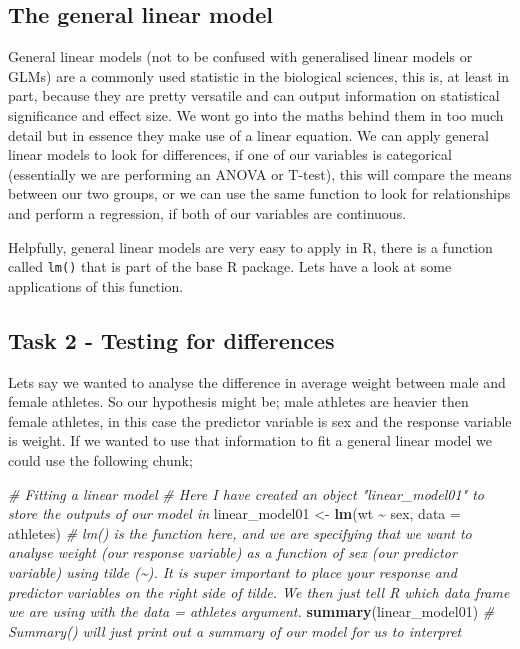 \documentclass[
]{book}
\newenvironment{Shaded}{\begin{snugshade}}{\end{snugshade}}
\newcommand{\AttributeTok}[1]{\textcolor[rgb]{0.13,0.29,0.53}{#1}}
\newcommand{\CommentTok}[1]{\textcolor[rgb]{0.56,0.35,0.01}{\textit{#1}}}
\newcommand{\FunctionTok}[1]{\textcolor[rgb]{0.13,0.29,0.53}{\textbf{#1}}}
\newcommand{\NormalTok}[1]{#1}
\newcommand{\OtherTok}[1]{\textcolor[rgb]{0.56,0.35,0.01}{#1}}
\newcommand{\SpecialCharTok}[1]{\textcolor[rgb]{0.81,0.36,0.00}{\textbf{#1}}}
\begin{document}
\subsection{The general linear model}\label{the-general-linear-model}

General linear models (not to be confused with generalised linear models or GLMs) are a commonly used statistic in the biological sciences, this is, at least in part, because they are pretty versatile and can output information on statistical significance and effect size. We wont go into the maths behind them in too much detail but in essence they make use of a linear equation. We can apply general linear models to look for differences, if one of our variables is categorical (essentially we are performing an ANOVA or T-test), this will compare the means between our two groups, or we can use the same function to look for relationships and perform a regression, if both of our variables are continuous.

Helpfully, general linear models are very easy to apply in R, there is a function called \texttt{lm()} that is part of the base R package. Lets have a look at some applications of this function.

\subsection{Task 2 - Testing for differences}\label{task-2---testing-for-differences}

Lets say we wanted to analyse the difference in average weight between male and female athletes. So our hypothesis might be; male athletes are heavier then female athletes, in this case the predictor variable is sex and the response variable is weight. If we wanted to use that information to fit a general linear model we could use the following chunk;

\begin{Shaded}
\begin{Highlighting}[]
\CommentTok{\# Fitting a linear model }
\CommentTok{\# Here I have created an object "linear\_model01" to store the outputs of our model in}
\NormalTok{linear\_model01 }\OtherTok{\textless{}{-}} \FunctionTok{lm}\NormalTok{(wt }\SpecialCharTok{\textasciitilde{}}\NormalTok{ sex, }\AttributeTok{data =}\NormalTok{ athletes) }\CommentTok{\# lm() is the function here, and we are specifying that we want to analyse weight (our response variable) as a function of sex (our predictor variable) using tilde (\textasciitilde{}). It is super important to place your response and predictor variables on the right side of tilde. We then just tell R which data frame we are using with the data = athletes argument. }
\FunctionTok{summary}\NormalTok{(linear\_model01) }\CommentTok{\# Summary() will just print out a summary of our model for us to interpret }
\end{Highlighting}
\end{Shaded}
\end{document}
